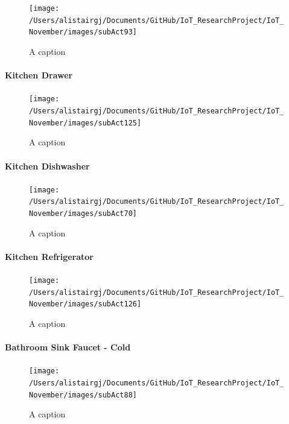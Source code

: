 \documentclass[11pt,]{article}
\let\oldparagraph\paragraph
\renewcommand{\paragraph}[1]{\oldparagraph{#1}\mbox{}}
\begin{document}
\begin{figure}[H]
\texttt{[image: /Users/alistairgj/Documents/GitHub/IoT\_ResearchProject/IoT\_November/images/subAct93]} \caption{A caption}\label{fig:subAct93}
\end{figure}

\hypertarget{kitchen-drawer}{%
\paragraph{Kitchen Drawer}\label{kitchen-drawer}}

\begin{figure}[H]
\texttt{[image: /Users/alistairgj/Documents/GitHub/IoT\_ResearchProject/IoT\_November/images/subAct125]} \caption{A caption}\label{fig:subAct125}
\end{figure}

\hypertarget{kitchen-dishwasher}{%
\paragraph{Kitchen Dishwasher}\label{kitchen-dishwasher}}

\begin{figure}[H]
\texttt{[image: /Users/alistairgj/Documents/GitHub/IoT\_ResearchProject/IoT\_November/images/subAct70]} \caption{A caption}\label{fig:subAct70}
\end{figure}

\hypertarget{kitchen-refrigerator}{%
\paragraph{Kitchen Refrigerator}\label{kitchen-refrigerator}}

\begin{figure}[H]
\texttt{[image: /Users/alistairgj/Documents/GitHub/IoT\_ResearchProject/IoT\_November/images/subAct126]} \caption{A caption}\label{fig:subAct126}
\end{figure}

\hypertarget{bathroom-sink-faucet---cold}{%
\paragraph{Bathroom Sink Faucet -
Cold}\label{bathroom-sink-faucet---cold}}

\begin{figure}[H]
\texttt{[image: /Users/alistairgj/Documents/GitHub/IoT\_ResearchProject/IoT\_November/images/subAct88]} \caption{A caption}\label{fig:subAct88}
\end{figure}
\end{document}
